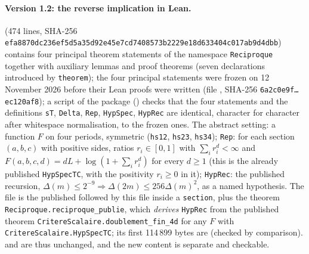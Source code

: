 \documentclass[11pt,a4paper]{article}
\theoremstyle{plain}
\theoremstyle{definition}
\theoremstyle{remark}
\numberwithin{equation}{section}
\begin{document}
\paragraph{Version 1.2: the reverse implication in Lean.}
 (474 lines, SHA-256 \texttt{efa8870dc236ef5d5a35d92e45e7cd7408573b2229e18d633404c017ab9d4dbb}) contains four principal theorem statements of the namespace \texttt{Reciproque} together with auxiliary lemmas and proof theorems (seven declarations introduced by \texttt{theorem}); the four principal statements were frozen on 12 November 2026 before their Lean proofs were written (file , SHA-256 \texttt{6a2c0e9f\dots ec120af8}); a script of the package () checks that the four statements and the definitions \texttt{sT}, \texttt{Delta}, \texttt{Rep}, \texttt{HypSpec}, \texttt{HypRec} are identical, character for character after whitespace normalisation, to the frozen ones. The abstract setting: a function $F$ on four periods, symmetric (\texttt{hs12}, \texttt{hs23}, \texttt{hs34}); \texttt{Rep}: for each section $(a,b,c)$ with positive sides, ratios $r_i\in[0,1]$ with $\sum_ir_i^d<\infty$ and $F(a,b,c,d)=dL+\log(1+\sum_ir_i^d)$ for every $d\ge1$ (this is the already published \texttt{HypSpecTC}, with the positivity $r_i\ge0$ in it); \texttt{HypRec}: the published recursion, $\Delta(m)\le2^{-9}\Rightarrow\Delta(2m)\le256\Delta(m)^2$, as a named hypothesis. The file  is the published  followed by this file inside a \texttt{section}, plus the theorem \texttt{Reciproque.reciproque\_publie}, which \emph{derives} \texttt{HypRec} from the published theorem \texttt{CritereScalaire.doublement\_fin\_4d} for any $F$ with \texttt{CritereScalaire.HypSpecTC}; its first 114\,899 bytes are  (checked by comparison).  and  are thus unchanged, and the new content is separate and checkable.
\end{document}
